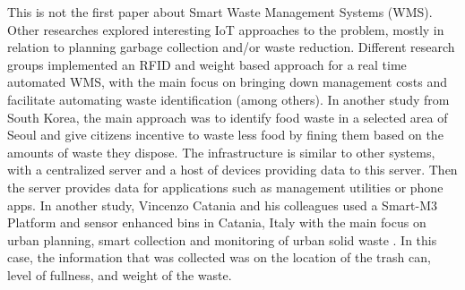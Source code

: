 This is not the first paper about Smart Waste Management Systems (WMS).
Other researches explored interesting IoT approaches to the problem, mostly in relation to planning garbage collection and/or waste reduction.
Different research groups implemented an RFID and weight  based approach for a real time automated WMS, with the main focus on bringing down management costs and facilitate automating waste identification \cite{france}\cite{australia} (among others).
In another study from South Korea, the main approach was to identify food waste in a selected area of Seoul and give citizens incentive to waste less food by fining them based on the amounts of waste they dispose\cite{korea}.
The infrastructure is similar to other systems, with a centralized server and a host of devices providing data to this server.
Then the server provides data for applications such as management utilities or phone apps.
In another study, Vincenzo Catania and his colleagues used a Smart-M3 Platform and sensor enhanced bins in Catania, Italy with the main focus on urban planning, smart collection and  monitoring of urban solid waste \cite{catania}. In this case, the information that was collected was on the location of the trash can, level of fullness, and weight of the waste.